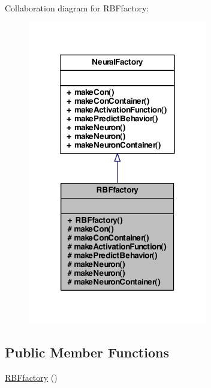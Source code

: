 Collaboration diagram for RBFfactory:
\nopagebreak
\begin{figure}[H]
\begin{center}
\leavevmode
\includegraphics[width=222pt]{class_r_b_ffactory__coll__graph}
\end{center}
\end{figure}
\subsection*{Public Member Functions}
\begin{DoxyCompactItemize}
\item 
\hyperlink{class_r_b_ffactory_af6d7b55c1c157b296f211c46f253f546}{RBFfactory} ()
\end{DoxyCompactItemize}
